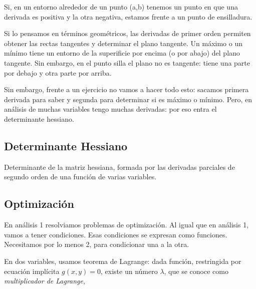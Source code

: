 Si, en un entorno alrededor de un punto (a,b)
tenemos un punto en que una derivada es positiva y la otra negativa,
estamos frente a un punto de ensilladura.

Si lo pensamos en términos geométricos, las derivadas de primer orden
permiten obtener las rectas tangentes y determinar el plano tangente.
Un máximo o un mínimo tiene un entorno de la superificie por encima (o por abajo)
del plano tangente.
Sin embargo, en el punto silla el plano no es tangente: 
tiene una parte por debajo y otra parte por arriba.

Sin embargo, frente a un ejercicio no vamos a hacer todo esto:
sacamos primera derivada para saber y segunda para determinar si es máximo o mínimo.
Pero, en análisis de muchas variables tengo muchas derivadas:
por eso entra el determinante hessiano.

\subsection{Determinante Hessiano}

Determinante de la matriz hessiana, formada por las derivadas parciales de segundo orden de una función de varias variables.

\subsection{Optimización}

En análisis 1 resolviamos problemas de optimización.
Al igual que en análisis 1, vamos a tener condiciones.
Esas condiciones se expresan como funciones.
Necesitamos por lo menos 2,
para condicionar una a la otra.

En dos variables, usamos teorema de Lagrange:
dada función,
restringida por ecuación implícita \(g(x,y)=0\),
existe un número \(\lambda\),
que se conoce como \textit{multiplicador de Lagrange},
